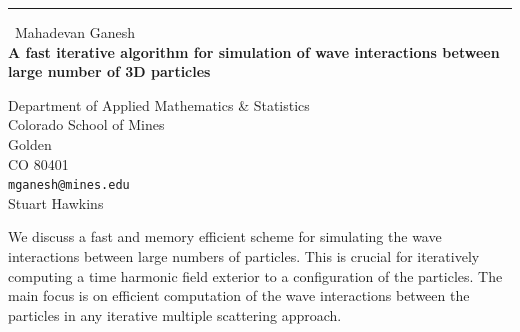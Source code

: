 \documentclass{report}
\begin{document}
\begin{center}
\rule{6in}{1pt} \
{\large Mahadevan Ganesh \\
{\bf A fast iterative algorithm for simulation of wave interactions between large number of 3D particles}}

Department of Applied Mathematics \& Statistics \\ Colorado School of Mines \\ Golden \\ CO 80401
\\
{\tt mganesh@mines.edu}\\
Stuart Hawkins\end{center}

We discuss a fast and memory efficient scheme for simulating the wave
interactions between large numbers of particles. This is crucial for
iteratively computing a time harmonic field exterior to a configuration
of the particles. The main focus is on efficient computation of the wave
interactions between the particles in any iterative multiple scattering
approach.
\end{document}
